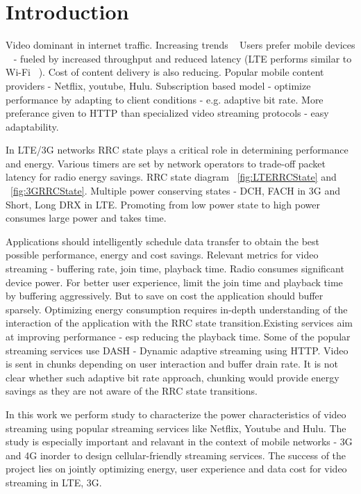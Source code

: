 \section{Introduction}
Video dominant in internet traffic. Increasing trends ~\cite{}
Users prefer mobile devices ~\cite{} - fueled by increased throughput and reduced latency (LTE performs similar to Wi-Fi ~\cite{LTEPaper}).
Cost of content delivery is also reducing. Popular mobile content providers - Netflix, youtube, Hulu. 
Subscription based model - optimize performance by adapting to client conditions - e.g. adaptive bit rate. 
More preferance given to HTTP than specialized video streaming protocols - easy adaptability.  

 
In LTE/3G networks RRC state plays a critical role in determining performance and energy. Various timers are set by network operators to trade-off packet latency for radio energy savings. RRC state diagram ~\ref{fig:LTERRCState} and ~\ref{fig:3GRRCState}. Multiple power conserving states - DCH, FACH in 3G and Short, Long DRX in LTE. Promoting from low power state to high power consumes large power and takes time.    

Applications should intelligently schedule data transfer to obtain the best possible performance, energy and cost savings. Relevant metrics for video streaming - buffering rate, join time, playback time. Radio consumes significant device power. For better user experience, limit the join time and playback time by buffering aggressively. But to save on cost the application should buffer sparsely. Optimizing energy consumption requires in-depth understanding of the interaction of the application with the RRC state transition.Existing services aim at improving performance - esp reducing the playback time. Some of the popular streaming services use DASH - Dynamic adaptive streaming using HTTP. Video is sent in chunks depending on user interaction and buffer drain rate. It is not clear whether such adaptive bit rate approach, chunking would provide energy savings as they are not aware of the RRC state transitions.           

In this work we perform study to characterize the power characteristics of video streaming using popular streaming services like Netflix, Youtube and Hulu. The study is especially important and relavant in the context of mobile networks - 3G and 4G inorder to design cellular-friendly streaming services. The success of the project lies on jointly optimizing energy, user experience and data cost for video streaming in LTE, 3G.      
